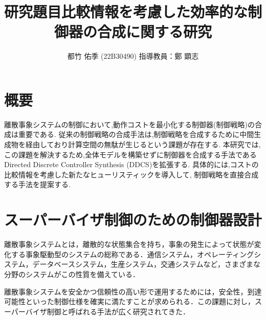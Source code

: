 \documentclass[11pt]{jarticle}
\begin{document}

\title{研究題目}
\title{比較情報を考慮した効率的な制御器の合成に関する研究}
\author{都竹 佑季 (22B30490) \;\; 指導教員：鄭 顕志}
\date{\empty} %
\maketitle %
\thispagestyle{fancy}


\section{概要} %
離散事象システムの制御において,動作コストを最小化する制御器(制御戦略)の合成は重要である.
従来の制御戦略の合成手法は,制御戦略を合成するために中間生成物を経由しており計算空間の無駄が生じるという課題が存在する.
本研究では,この課題を解決するため,全体モデルを構築せずに制御器を合成する手法であるDirected Discrete Controller Synthesis (DDCS)\cite{ddcs}を拡張する.
具体的には,コストの比較情報を考慮した新たなヒューリスティックを導入して, 制御戦略を直接合成する手法を提案する.

\section{スーパーバイザ制御のための制御器設計}
離散事象システムとは，離散的な状態集合を持ち，事象の発生によって状態が変化する事象駆動型のシステムの総称である．通信システム，オペレーティングシステム，データベースシステム，生産システム，交通システムなど，さまざまな分野のシステムがこの性質を備えている．

離散事象システムを安全かつ信頼性の高い形で運用するためには，安全性，到達可能性といった制御仕様を確実に満たすことが求められる．この課題に対し，スーパーバイザ制御と呼ばれる手法が広く研究されてきた．
\end{document}
